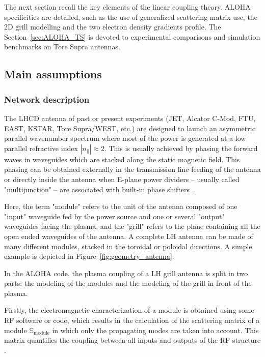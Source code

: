 The next section recall the key elements of the linear coupling theory. ALOHA specificities are detailed, such as the use of generalized scattering matrix use, the 2D grill modelling and the two electron density gradients profile. The Section~\ref{sec:ALOHA_TS} is devoted to experimental comparisons and simulation benchmarks on Tore Supra antennas. 


\subsection{Main assumptions}\label{sec:Theory}

\subsubsection{Network description}\label{sec:network_description}

The LHCD antenna of past or present experiments (JET, Alcator C-Mod, FTU, EAST, KSTAR, Tore Supra/WEST, etc.) are designed to launch an asymmetric parallel wavenumber spectrum where most of the power is generated at a low parallel refractive index $\left|n_{\parallel}\right|\approx2$. This is usually achieved by phasing the forward waves in waveguides which are stacked along the static magnetic field. This phasing can be obtained externally in the transmission line feeding of the antenna  or directly inside the antenna when E-plane power dividers -- usually called "multijunction"  -- are associated with built-in phase shifters .

Here, the term "module" refers to the unit of the antenna composed of one "input" waveguide fed by the power source and one or several "output" waveguides facing the plasma, and the "grill" refers to the plane containing all the open ended waveguides of the antenna. A complete LH antenna can be made of many different modules, stacked in the toroidal or poloidal directions. A simple example is depicted in Figure~\ref{fig:geometry_antenna}.

In the ALOHA code, the plasma coupling of a LH grill antenna is split in two parts: the modeling of the modules and the modeling of the grill in front of the plasma. 

Firstly, the electromagnetic characterization of a module is obtained using some RF software or code, which results in the calculation of the scattering matrix of a module $\mathbb{S}_{\mbox{module}}$ in which only the propagating modes are taken into account. This matrix quantifies the coupling between all inputs and outputs of the RF structure \cite{kurokawa1965}. 

